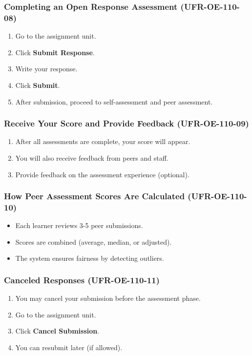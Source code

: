 \subsubsection{Completing an Open Response Assessment (UFR-OE-110-08)}
\begin{enumerate}
    \item Go to the assignment unit.
    \item Click \textbf{Submit Response}.
    \item Write your response.
    \item Click \textbf{Submit}.
    \item After submission, proceed to self-assessment and peer assessment.
\end{enumerate}

\subsubsection{Receive Your Score and Provide Feedback (UFR-OE-110-09)}
\begin{enumerate}
    \item After all assessments are complete, your score will appear.
    \item You will also receive feedback from peers and staff.
    \item Provide feedback on the assessment experience (optional).
\end{enumerate}

\subsubsection{How Peer Assessment Scores Are Calculated (UFR-OE-110-10)}
\begin{itemize}
    \item Each learner reviews 3-5 peer submissions.
    \item Scores are combined (average, median, or adjusted).
    \item The system ensures fairness by detecting outliers.
\end{itemize}

\subsubsection{Canceled Responses (UFR-OE-110-11)}
\begin{enumerate}
    \item You may cancel your submission before the assessment phase.
    \item Go to the assignment unit.
    \item Click \textbf{Cancel Submission}.
    \item You can resubmit later (if allowed).
\end{enumerate}


